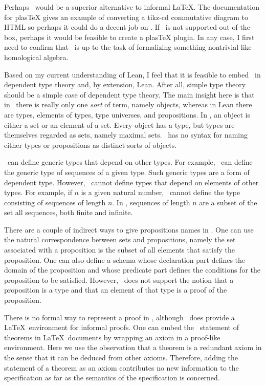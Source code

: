 \documentclass{amsart}
\begin{document}
Perhaps \ZN\ would be a superior alternative to informal \LaTeX.
The documentation for plasTeX gives an example of converting a tikz-cd commutative diagram to HTML so perhaps it could do
a decent job on \ZN.
If \ZN\ is not supported out-of-the-box, perhaps it would be feasible to create a plasTeX plugin.
In any case, I first need to confirm that \ZN\ is up to the task of formalizing something nontrivial like homological algebra.

Based on my current understanding of Lean, I feel that it is feasible to embed \ZN\ in dependent type theory and, by extension, Lean.
After all, simple type theory should be a simple case of dependent type theory.
The main insight here is that in \ZN\ there is really only one \textit{sort} of term, 
namely objects, whereas in Lean there are types, elements of types,
type universes, and propositions.
In \ZN, an object is either a set or an element of a set.
Every object has a type, but types are themselves regarded as sets, namely maximal sets.
\ZN\ has no syntax for naming either types or propositions as distinct sorts of objects.

\ZN\ can define generic types that depend on other types.
For example, \ZN\ can define the generic type of sequences of a given type.
Such generic types are a form of dependent type.
However, \ZN\ cannot define types that depend on elements of other types.
For example, if $n$ is a given natural number, \ZN\ cannot define the type consisting of sequences of length $n$. 
In \ZN, sequences of length $n$ are a subset of the set all sequences, both finite and infinite.

There are a couple of indirect ways to give propositions names in \ZN.
One can use the natural correspondence between sets and propositions, namely the set associated with a proposition is the subset of all
elements that satisfy the proposition.
One can also define a schema whose declaration part defines the domain of the proposition and whose predicate part defines
the conditions for the proposition to be satisfied.
However, \ZN\ does not support the notion that a proposition is a type and that an element of that type is a proof of the proposition.

There is no formal way to represent a proof in \ZN, although \fuzz\ does provide a \LaTeX\ environment for informal proofs.
One can embed the \ZN\ statement of theorems in \LaTeX\ documents by wrapping an axiom in a proof-like environment.
Here we use the observation that a theorem is a redundant axiom in the sense that it can be deduced from other axioms.
Therefore, adding the statement of a theorem as an axiom contributes no new information to the specification as far as the
semantics of the specification is concerned.
\end{document}
